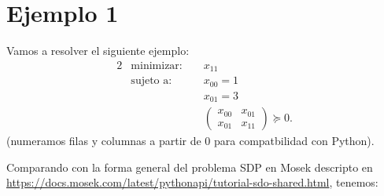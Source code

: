 \documentclass[11pt]{article}
\begin{document}
\section{Ejemplo 1}

Vamos a resolver el siguiente ejemplo:
\begin{alignat*}{2}
  & \text{minimizar: } & & x_{11} \\
  & \text{sujeto a: } & & x_{00} = 1 \\
  & & & x_{01} = 3 \\
  & & & \begin{pmatrix} x_{00} & x_{01} \\ x_{01} & x_{11} \end{pmatrix} \succeq 0.
\end{alignat*}
(numeramos filas y columnas a partir de 0 para compatbilidad con Python).

Comparando con la forma general del problema SDP en Mosek descripto en \url{https://docs.mosek.com/latest/pythonapi/tutorial-sdo-shared.html}, tenemos:
\end{document}
